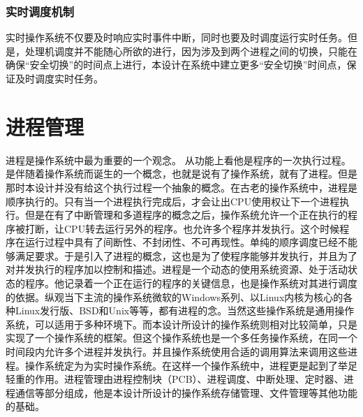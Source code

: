 \documentclass[UTF8,nofonts,cs4size]{ctexrep}
\begin{document}
\subsubsection{实时调度机制}
实时操作系统不仅要及时响应实时事件中断，同时也要及时调度运行实时任务。但是，处理机调度并不能随心所欲的进行，因为涉及到两个进程之间的切换，只能在确保“安全切换”的时间点上进行，本设计在系统中建立更多“安全切换”时间点，保证及时调度实时任务。
\section{进程管理}
进程是操作系统中最为重要的一个观念。                                                                                                                                                                                                                                                                                                                                                                                                                                                                                                                                                                                                                                                                                                                                                                                                                                                                                 从功能上看他是程序的一次执行过程。是伴随着操作系统而诞生的一个概念，也就是说有了操作系统，就有了进程。但是那时本设计并没有给这个执行过程一个抽象的概念。在古老的操作系统中，进程是顺序执行的。只有当一个进程执行完成后，才会让出CPU使用权让下一个进程执行。但是在有了中断管理和多道程序的概念之后，操作系统允许一个正在执行的程序被打断，让CPU转去运行另外的程序。也允许多个程序并发执行。这个时候程序在运行过程中具有了间断性、不封闭性、不可再现性。单纯的顺序调度已经不能够满足要求。于是引入了进程的概念，这也是为了使程序能够并发执行，并且为了对并发执行的程序加以控制和描述。进程是一个动态的使用系统资源、处于活动状态的程序。他记录着一个正在运行的程序的关键信息，也是操作系统对其进行调度的依据。纵观当下主流的操作系统微软的Windows系列、以Linux内核为核心的各种Linux发行版、BSD和Unix等等，都有进程的念。当然这些操作系统是通用操作系统，可以适用于多种环境下。而本设计所设计的操作系统则相对比较简单，只是实现了一个操作系统的框架。但这个操作系统也是一个多任务操作系统，在同一个时间段内允许多个进程并发执行。并且操作系统使用合适的调用算法来调用这些进程。操作系统定为为实时操作系统。在这样一个操作系统中，进程更是起到了举足轻重的作用。进程管理由进程控制块（PCB）、进程调度、中断处理、定时器、进程通信等部分组成，他是本设计所设计的操作系统存储管理、文件管理等其他功能的基础。
\end{document}
